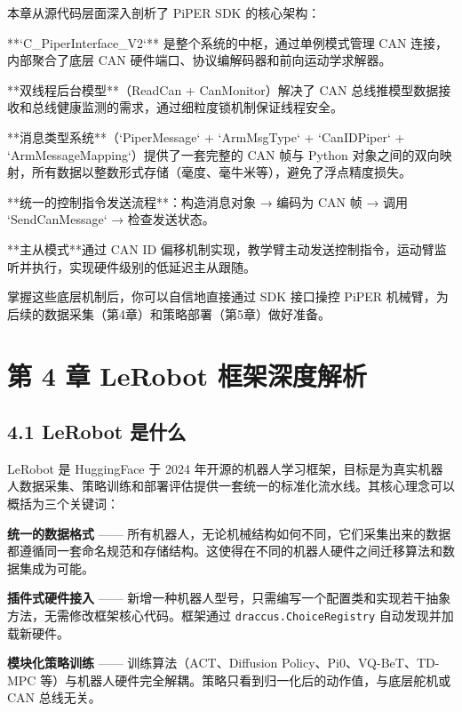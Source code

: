 \documentclass[UTF8,a4paper,11pt]{ctexart}
\begin{document}
本章从源代码层面深入剖析了 PiPER SDK 的核心架构：

\item[1] **`C_PiperInterface_V2`** 是整个系统的中枢，通过单例模式管理 CAN 连接，内部聚合了底层 CAN 硬件端口、协议编解码器和前向运动学求解器。

\item[2] **双线程后台模型**（ReadCan + CanMonitor）解决了 CAN 总线推模型数据接收和总线健康监测的需求，通过细粒度锁机制保证线程安全。

\item[3] **消息类型系统**（`PiperMessage` + `ArmMsgType` + `CanIDPiper` + `ArmMessageMapping`）提供了一套完整的 CAN 帧与 Python 对象之间的双向映射，所有数据以整数形式存储（毫度、毫牛米等），避免了浮点精度损失。

\item[4] **统一的控制指令发送流程**：构造消息对象 → 编码为 CAN 帧 → 调用 `SendCanMessage` → 检查发送状态。

\item[5] **主从模式**通过 CAN ID 偏移机制实现，教学臂主动发送控制指令，运动臂监听并执行，实现硬件级别的低延迟主从跟随。

掌握这些底层机制后，你可以自信地直接通过 SDK 接口操控 PiPER 机械臂，为后续的数据采集（第4章）和策略部署（第5章）做好准备。

\endgroup
\newpage

\begingroup
\section{第 4 章 LeRobot 框架深度解析}

\subsection{4.1 LeRobot 是什么}

LeRobot 是 HuggingFace 于 2024 年开源的机器人学习框架，目标是为真实机器人数据采集、策略训练和部署评估提供一套统一的标准化流水线。其核心理念可以概括为三个关键词：

\textbf{统一的数据格式} —— 所有机器人，无论机械结构如何不同，它们采集出来的数据都遵循同一套命名规范和存储结构。这使得在不同的机器人硬件之间迁移算法和数据集成为可能。

\textbf{插件式硬件接入} —— 新增一种机器人型号，只需编写一个配置类和实现若干抽象方法，无需修改框架核心代码。框架通过 \texttt{draccus.ChoiceRegistry} 自动发现并加载新硬件。

\textbf{模块化策略训练} —— 训练算法（ACT、Diffusion Policy、Pi0、VQ-BeT、TD-MPC 等）与机器人硬件完全解耦。策略只看到归一化后的动作值，与底层舵机或 CAN 总线无关。
\end{document}
